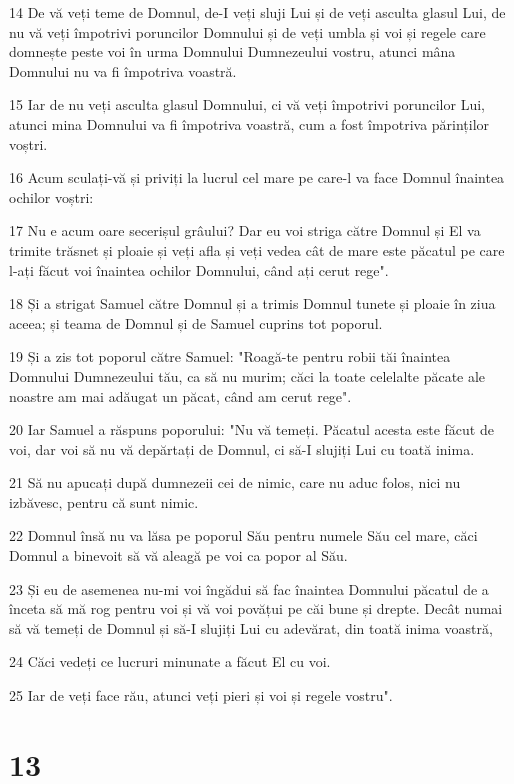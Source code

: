 \par 14 De vă veți teme de Domnul, de-I veți sluji Lui și de veți asculta glasul Lui, de nu vă veți împotrivi poruncilor Domnului și de veți umbla și voi și regele care domnește peste voi în urma Domnului Dumnezeului vostru, atunci mâna Domnului nu va fi împotriva voastră.
\par 15 Iar de nu veți asculta glasul Domnului, ci vă veți împotrivi poruncilor Lui, atunci mina Domnului va fi împotriva voastră, cum a fost împotriva părinților voștri.
\par 16 Acum sculați-vă și priviți la lucrul cel mare pe care-l va face Domnul înaintea ochilor voștri:
\par 17 Nu e acum oare secerișul grâului? Dar eu voi striga către Domnul și El va trimite trăsnet și ploaie și veți afla și veți vedea cât de mare este păcatul pe care l-ați făcut voi înaintea ochilor Domnului, când ați cerut rege".
\par 18 Și a strigat Samuel către Domnul și a trimis Domnul tunete și ploaie în ziua aceea; și teama de Domnul și de Samuel cuprins tot poporul.
\par 19 Și a zis tot poporul către Samuel: "Roagă-te pentru robii tăi înaintea Domnului Dumnezeului tău, ca să nu murim; căci la toate celelalte păcate ale noastre am mai adăugat un păcat, când am cerut rege".
\par 20 Iar Samuel a răspuns poporului: "Nu vă temeți. Păcatul acesta este făcut de voi, dar voi să nu vă depărtați de Domnul, ci să-I slujiți Lui cu toată inima.
\par 21 Să nu apucați după dumnezeii cei de nimic, care nu aduc folos, nici nu izbăvesc, pentru că sunt nimic.
\par 22 Domnul însă nu va lăsa pe poporul Său pentru numele Său cel mare, căci Domnul a binevoit să vă aleagă pe voi ca popor al Său.
\par 23 Și eu de asemenea nu-mi voi îngădui să fac înaintea Domnului păcatul de a înceta să mă rog pentru voi și vă voi povățui pe căi bune și drepte. Decât numai să vă temeți de Domnul și să-I slujiți Lui cu adevărat, din toată inima voastră,
\par 24 Căci vedeți ce lucruri minunate a făcut El cu voi.
\par 25 Iar de veți face rău, atunci veți pieri și voi și regele vostru".

\chapter{13}

